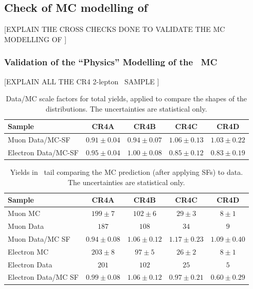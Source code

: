 \clearpage

\subsection{Check of MC modelling of \ttdl}


[EXPLAIN THE CROSS CHECKS DONE TO VALIDATE THE MC MODELLING OF \ttdl]

\subsubsection{Validation of the ``Physics'' Modelling of the \ttdl\ MC}

[EXPLAIN ALL THE CR4 2-lepton \ttdl\ SAMPLE ]

\begin{table}[!h]
\begin{center}
\begin{tabular}{l||c|c|c|c}
\hline
Sample              & CR4A & CR4B & CR4C & CR4D \\
\hline
\hline
Muon Data/MC-SF 	  & $0.91 \pm 0.04$ & $0.94 \pm 0.07$ & $1.06 \pm 0.13$ & $1.03 \pm 0.22$ \\
\hline
\hline
Electron Data/MC-SF 	  & $0.95 \pm 0.04$ & $1.00 \pm 0.08$ & $0.85 \pm 0.12$ & $0.83 \pm 0.19$ \\
\hline
\end{tabular}
\caption{ Data/MC scale factors for total yields, applied to compare
  the shapes of the distributions.
  The uncertainties are statistical only.
\label{tab:cr4mtsf}}
\end{center}
\end{table}


\begin{table}[!h]
\begin{center}
\begin{tabular}{l||c|c|c|c}
\hline
Sample              & CR4A & CR4B & CR4C & CR4D \\
\hline
\hline
Muon MC 		  & $199 \pm 7$ & $102 \pm 6$ & $29 \pm 3$ & $8 \pm 1$ \\
Muon Data 		  & $187$ & $108$ & $34$ & $9$ \\
\hline
Muon Data/MC SF 	  & $0.94 \pm 0.08$ & $1.06 \pm 0.12$ & $1.17 \pm 0.23$ & $1.09 \pm 0.40$ \\
\hline
\hline
Electron MC 		  & $203 \pm 8$ & $97 \pm 5$ & $26 \pm 2$ & $8 \pm 1$ \\
Electron Data 		  & $201$ & $102$ & $25$ & $5$ \\
\hline
Electron Data/MC SF 	  & $0.99 \pm 0.08$ & $1.06 \pm 0.12$ & $0.97 \pm 0.21$ & $0.60 \pm 0.29$ \\
\hline
\end{tabular}
\caption{ Yields in \mt\ tail comparing the MC prediction (after
  applying SFs) to data. The uncertainties are statistical only.
\label{tab:cr4yields}}
\end{center}
\end{table}

